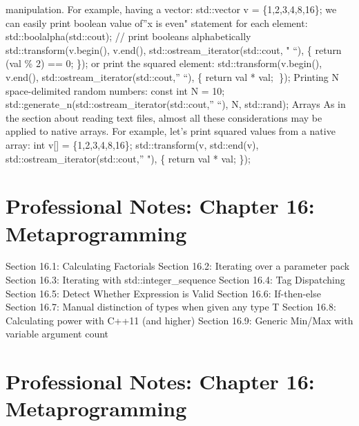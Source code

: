 manipulation. For example, having a vector: std::vector v =
\{1,2,3,4,8,16\}; we can easily print boolean value of''x is even"
statement for each element: std::boolalpha(std::cout); // print booleans
alphabetically std::transform(v.begin(), v.end(),
std::ostream\_iterator(std::cout, " ``), \href{int\%20val}{} \{ return
(val \% 2) == 0; \}); or print the squared element:
std::transform(v.begin(), v.end(), std::ostream\_iterator(std::cout,''
``), \href{int\%20val}{} \{ return val * val; \}); Printing N
space-delimited random numbers: const int N = 10;
std::generate\_n(std::ostream\_iterator(std::cout,'' ``), N, std::rand);
Arrays As in the section about reading text ﬁles, almost all these
considerations may be applied to native arrays. For example, let's print
squared values from a native array: int v{[}{]} = \{1,2,3,4,8,16\};
std::transform(v, std::end(v), std::ostream\_iterator(std::cout,'' "),
\href{int\%20val}{} \{ return val * val; \});

\hypertarget{professional-notes-chapter-16-metaprogramming}{%
\chapter{Professional Notes: Chapter 16:
Metaprogramming}\label{professional-notes-chapter-16-metaprogramming}}

Section 16.1: Calculating Factorials Section 16.2: Iterating over a
parameter pack Section 16.3: Iterating with std::integer\_sequence
Section 16.4: Tag Dispatching Section 16.5: Detect Whether Expression is
Valid Section 16.6: If-then-else Section 16.7: Manual distinction of
types when given any type T Section 16.8: Calculating power with C++11
(and higher) Section 16.9: Generic Min/Max with variable argument count

\hypertarget{professional-notes-chapter-16-metaprogramming-1}{%
\chapter{Professional Notes: Chapter 16:
Metaprogramming}\label{professional-notes-chapter-16-metaprogramming-1}}

